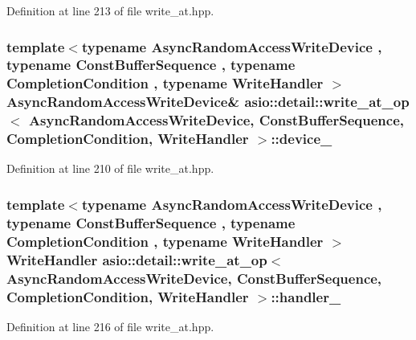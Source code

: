 Definition at line 213 of file write\+\_\+at.\+hpp.

\hypertarget{classasio_1_1detail_1_1write__at__op_a6b97c06ca4eae45e8d5c2d09f7e184eb}{}
\subsubsection[{device\+\_\+}]{\setlength{\rightskip}{0pt plus 5cm}template$<$typename Async\+Random\+Access\+Write\+Device , typename Const\+Buffer\+Sequence , typename Completion\+Condition , typename Write\+Handler $>$ Async\+Random\+Access\+Write\+Device\& {\bf asio\+::detail\+::write\+\_\+at\+\_\+op}$<$ Async\+Random\+Access\+Write\+Device, Const\+Buffer\+Sequence, Completion\+Condition, Write\+Handler $>$\+::device\+\_\+}\label{classasio_1_1detail_1_1write__at__op_a6b97c06ca4eae45e8d5c2d09f7e184eb}


Definition at line 210 of file write\+\_\+at.\+hpp.

\hypertarget{classasio_1_1detail_1_1write__at__op_ad162500a8d8acf7aa6b9e08179fdf35d}{}
\subsubsection[{handler\+\_\+}]{\setlength{\rightskip}{0pt plus 5cm}template$<$typename Async\+Random\+Access\+Write\+Device , typename Const\+Buffer\+Sequence , typename Completion\+Condition , typename Write\+Handler $>$ Write\+Handler {\bf asio\+::detail\+::write\+\_\+at\+\_\+op}$<$ Async\+Random\+Access\+Write\+Device, Const\+Buffer\+Sequence, Completion\+Condition, Write\+Handler $>$\+::handler\+\_\+}\label{classasio_1_1detail_1_1write__at__op_ad162500a8d8acf7aa6b9e08179fdf35d}


Definition at line 216 of file write\+\_\+at.\+hpp.

\hypertarget{classasio_1_1detail_1_1write__at__op_ac4bd5bf64bbd90b4652fb80052199c50}{}
